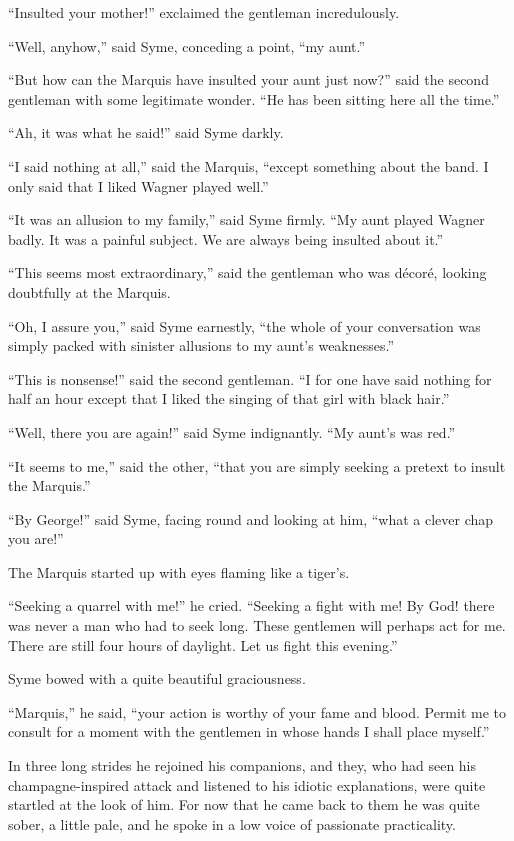 “Insulted your mother!” exclaimed the gentleman incredulously.

“Well, anyhow,” said Syme, conceding a point, “my aunt.”

“But how can the Marquis have insulted your aunt just now?” said the second gentleman with some legitimate wonder. “He has been sitting here all the time.”

“Ah, it was what he said!” said Syme darkly.

“I said nothing at all,” said the Marquis, “except something about the band. I only said that I liked Wagner played well.”

“It was an allusion to my family,” said Syme firmly. “My aunt played Wagner badly. It was a painful subject. We are always being insulted about it.”

“This seems most extraordinary,” said the gentleman who was décoré, looking doubtfully at the Marquis.

“Oh, I assure you,” said Syme earnestly, “the whole of your conversation was simply packed with sinister allusions to my aunt’s weaknesses.”

“This is nonsense!” said the second gentleman. “I for one have said nothing for half an hour except that I liked the singing of that girl with black hair.”

“Well, there you are again!” said Syme indignantly. “My aunt’s was red.”

“It seems to me,” said the other, “that you are simply seeking a pretext to insult the Marquis.”

“By George!” said Syme, facing round and looking at him, “what a clever chap you are!”

The Marquis started up with eyes flaming like a tiger’s.

“Seeking a quarrel with me!” he cried. “Seeking a fight with me! By God! there was never a man who had to seek long. These gentlemen will perhaps act for me. There are still four hours of daylight. Let us fight this evening.”

Syme bowed with a quite beautiful graciousness.

“Marquis,” he said, “your action is worthy of your fame and blood. Permit me to consult for a moment with the gentlemen in whose hands I shall place myself.”

In three long strides he rejoined his companions, and they, who had seen his champagne-inspired attack and listened to his idiotic explanations, were quite startled at the look of him. For now that he came back to them he was quite sober, a little pale, and he spoke in a low voice of passionate practicality.


